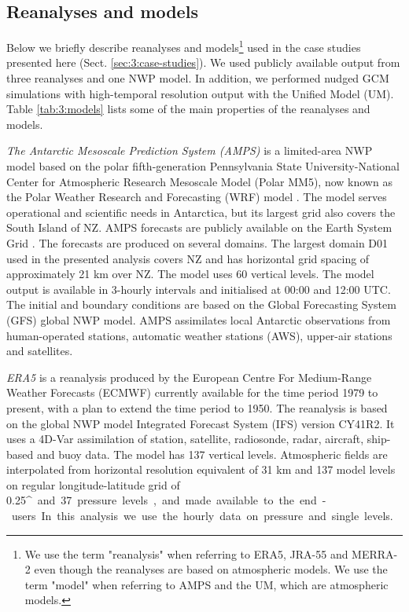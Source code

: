 \subsection{Reanalyses and models}
\label{sec:3:reanalyses-and-models}

Below we briefly describe reanalyses and models\footnote{We use the term "reanalysis" when referring to ERA5, JRA-55 and MERRA-2 even though the reanalyses are based on atmospheric models. We use the term "model" when referring to AMPS and the UM, which are atmospheric models.} used in the case studies
presented here (Sect. \ref{sec:3:case-studies}). We used publicly available output from three reanalyses and one NWP model. In addition, we performed nudged GCM simulations with
high-temporal resolution output with the Unified Model (UM).
Table \ref{tab:3:models} lists some of the main properties of the reanalyses and
models.

\textit{The Antarctic Mesoscale Prediction System (AMPS)} \citep{powers2003}
is a limited-area NWP model based on the polar fifth-generation Pennsylvania State
University-National Center for Atmospheric Research Mesoscale Model (Polar MM5),
now known as the Polar Weather Research and Forecasting (WRF) model \citep{hines2008}.
The model serves operational and scientific needs in Antarctica, but its largest grid also covers the South Island of NZ.
AMPS forecasts are publicly available on the Earth System Grid
\citep{williams2009b}.
The forecasts are produced on several domains. The largest domain D01 used in the presented analysis covers
NZ and has horizontal grid spacing of approximately 21 km over NZ. The model uses 60 vertical levels. The model output is available
in 3-hourly intervals and initialised at 00:00 and 12:00 UTC. The initial and
boundary conditions are based on the Global Forecasting System (GFS) global
NWP model. AMPS assimilates local Antarctic observations from human-operated stations, automatic
weather stations (AWS), upper-air stations and satellites.

\textit{ERA5} \citep{era5} is a reanalysis produced by the European Centre
For Medium-Range Weather Forecasts (ECMWF) currently available for the time
period 1979 to present, with a plan to extend the time period to 1950.
The reanalysis is based on the global NWP model Integrated Forecast System (IFS)
version CY41R2. It uses a 4D-Var assimilation of station, satellite,
radiosonde, radar, aircraft, ship-based and buoy data. The model has 137
vertical levels. Atmospheric fields are interpolated from horizontal resolution
equivalent of 31 km and 137 model levels on regular longitude-latitude grid
of 0.25\unit{^\circ} and 37 pressure levels, and made available to the end-users.
In this analysis we use the hourly data on pressure and single levels.

